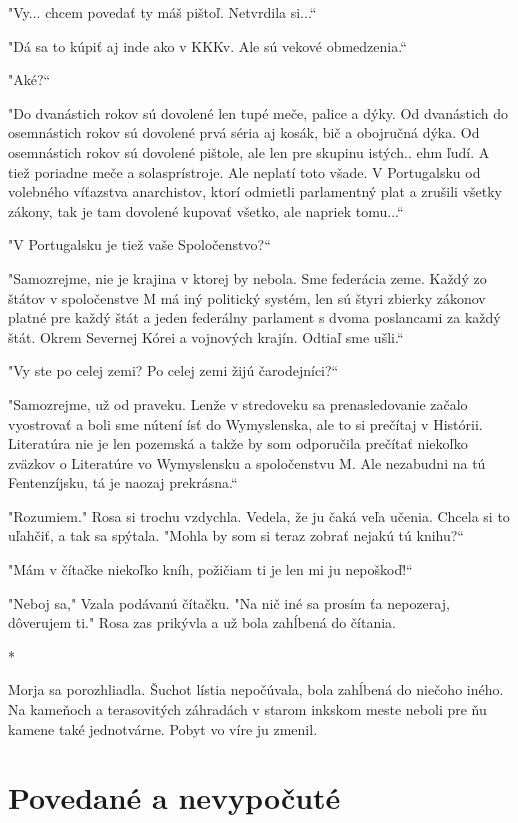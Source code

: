 \documentclass{book}
\begin{document}
"$ $Vy... chcem povedať ty máš pištoľ. Netvrdila si...“

"$ $Dá sa to kúpiť aj inde ako v KKKv. Ale sú vekové obmedzenia.“

"$ $Aké?“

"$ $Do dvanástich rokov sú dovolené len tupé meče, palice a dýky. Od dvanástich do osemnástich rokov sú dovolené prvá séria aj kosák, bič a obojručná dýka. Od osemnástich rokov sú dovolené pištole, ale len pre skupinu istých.. ehm ľudí. A tiež poriadne meče a solasprístroje. Ale neplatí toto všade. V Portugalsku od volebného víťazstva anarchistov, ktorí odmietli parlamentný plat a zrušili všetky zákony, tak je tam dovolené kupovať všetko, ale napriek tomu...“

"$ $V Portugalsku je tiež vaše Spoločenstvo?“

"$ $Samozrejme, nie je krajina v ktorej by nebola. Sme federácia zeme. Každý zo štátov v spoločenstve M má iný politický systém, len sú štyri zbierky zákonov platné pre každý štát a jeden federálny parlament s dvoma poslancami za každý štát. Okrem Severnej Kórei a vojnových krajín. Odtiaľ sme ušli.“

"$ $Vy ste po celej zemi? Po celej zemi žijú čarodejníci?“

"$ $Samozrejme, už od praveku. Lenže v stredoveku sa prenasledovanie začalo vyostrovať a boli sme nútení ísť do Wymyslenska, ale to si prečítaj v Histórii. Literatúra nie je len pozemská a takže by som odporučila prečítať niekoľko zväzkov o Literatúre vo Wymyslensku a spoločenstvu M. Ale nezabudni na tú Fentenzíjsku, tá je naozaj prekrásna.“

"$ $Rozumiem."$ $ Rosa si trochu vzdychla. Vedela, že ju čaká veľa učenia. Chcela si to uľahčiť, a tak sa spýtala. "$ $Mohla by som si teraz zobrať nejakú tú knihu?“

"$ $Mám v čítačke niekoľko kníh, požičiam ti je len mi ju nepoškoď!“

"$ $Neboj sa,"$ $ Vzala podávanú čítačku. "$ $Na nič iné sa prosím ťa nepozeraj, dôverujem ti."$ $ Rosa zas prikývla a už bola zahĺbená do čítania.

\begin{center}
*
\end{center}

Morja sa porozhliadla. Šuchot lístia nepočúvala, bola zahĺbená do niečoho iného. Na kameňoch a terasovitých záhradách v starom inkskom meste neboli pre ňu kamene také jednotvárne. Pobyt vo víre ju zmenil.


\chapter{Povedané a nevypočuté}
\end{document}
